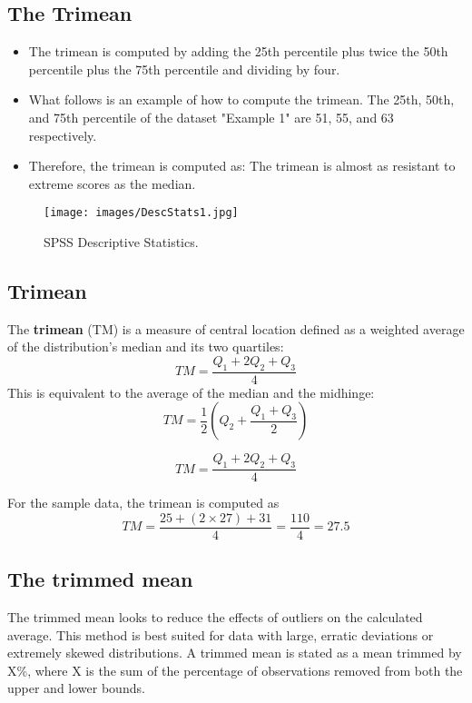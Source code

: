 \documentclass[]{report}
\begin{document}


	\subsection{The Trimean}
	\begin{itemize}
		\item 	The trimean is computed by adding the 25th percentile plus twice the 50th percentile plus the 75th percentile and dividing by four. 
		\item What follows is an example of how to compute the trimean. The 25th, 50th, and 75th percentile of the dataset "Example 1" are 51, 55, and 63 respectively. 
		\item Therefore, the trimean is computed as:
		The trimean is almost as resistant to extreme scores as the median.
	\end{itemize}
	
	
	
	
	
	\begin{figure}[h!]
		\begin{center}
			\texttt{[image: images/DescStats1.jpg]}
			\caption{SPSS Descriptive Statistics.}\label{DescStats}
		\end{center}
	\end{figure}


	\subsection{Trimean}
	
	The \textbf{trimean} (TM) is a measure of central location defined as a weighted average of the distribution's median and its two quartiles:
	\[TM= \frac{Q_1 + 2Q_2 + Q_3}{4}\]
	This is equivalent to the average of the median and the midhinge:
	\[TM= \frac{1}{2}\left(Q_2 + \frac{Q_1 + Q_3}{2}\right)\]

	
	\[TM= \frac{Q_1 + 2Q_2 + Q_3}{4}\]
	
	For the sample data, the trimean is computed as
	\[TM= \frac{25 + (2\times 27) + 31}{4} = \frac{110}{4} = 27.5\]
	
	
	\subsection{The trimmed mean}
	The trimmed mean looks to reduce the effects of outliers on the calculated average. This method is best suited for data with large, erratic deviations or extremely skewed distributions.  A trimmed mean is stated as a mean trimmed by X\%, where X is the sum of the percentage of observations removed from both the upper and lower bounds.
	
\end{document}
